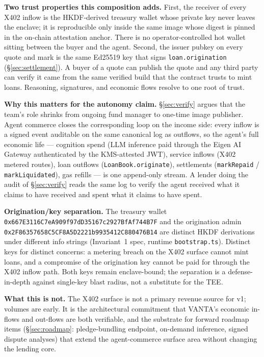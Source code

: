 \documentclass[11pt,letterpaper]{article}
\begin{document}
\textbf{Two trust properties this composition adds.} First, the receiver of every X402 inflow is the HKDF-derived treasury wallet whose private key never leaves the enclave; it is reproducible only inside the same image whose digest is pinned in the on-chain attestation anchor. There is no operator-controlled hot wallet sitting between the buyer and the agent. Second, the issuer pubkey on every quote and mark is the same Ed25519 key that signs \texttt{loan.origination} (\S\ref{sec:settlement}). A buyer of a quote can publish the quote and any third party can verify it came from the same verified build that the contract trusts to mint loans. Reasoning, signatures, and economic flows resolve to one root of trust.

\textbf{Why this matters for the autonomy claim.} \S\ref{sec:verify} argues that the team's role shrinks from ongoing fund manager to one-time image publisher. Agent commerce closes the corresponding loop on the income side: every inflow is a signed event auditable on the same canonical log as outflows, so the agent's full economic life --- cognition spend (LLM inference paid through the Eigen AI Gateway authenticated by the KMS-attested JWT), service inflows (X402 metered routes), loan outflows (\texttt{LoanBook.originate}), settlements (\texttt{markRepaid} / \texttt{markLiquidated}), gas refills --- is one append-only stream. A lender doing the audit of \S\ref{sec:verify} reads the same log to verify the agent received what it claims to have received and spent what it claims to have spent.

\textbf{Origination/key separation.} The treasury wallet \texttt{0x667E3116C7eA909f97dD35167c2927BfAf744B7F} and the origination admin \texttt{0x2F86357658C5CF8A5D2221b9935412C880476B14} are distinct HKDF derivations under different info strings (Invariant~1 spec, runtime \texttt{bootstrap.ts}). Distinct keys for distinct concerns: a metering breach on the X402 surface cannot mint loans, and a compromise of the origination key cannot be paid for through the X402 inflow path. Both keys remain enclave-bound; the separation is a defense-in-depth against single-key blast radius, not a substitute for the TEE.

\textbf{What this is not.} The X402 surface is not a primary revenue source for v1; volumes are early. It is the architectural commitment that VANTA's economic in-flows and out-flows are both verifiable, and the substrate for forward roadmap items (\S\ref{sec:roadmap}: pledge-bundling endpoint, on-demand inference, signed dispute analyses) that extend the agent-commerce surface area without changing the lending core.
\end{document}
